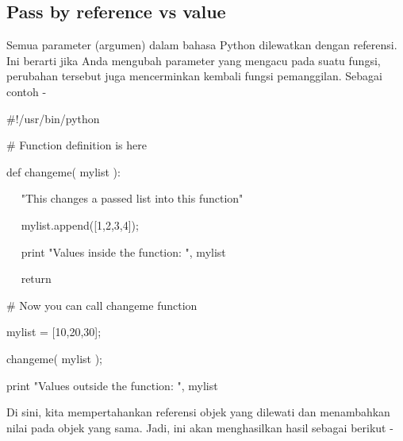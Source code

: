 \documentclass[a4paper,12pt]{report}
\begin{document}
\subsection*{Pass by reference vs value}
 \par
\begin{adjustwidth}{0.03in}{0.03in}
Semua parameter (argumen) dalam bahasa Python dilewatkan dengan referensi. Ini berarti jika Anda mengubah parameter yang mengacu pada suatu fungsi, perubahan tersebut juga mencerminkan kembali fungsi pemanggilan. Sebagai contoh -\end{adjustwidth}
 \par
\noindent 
 \hspace*{0.5in}  $  \#  $!/usr/bin/python \par
\vspace{12pt}
\noindent 
 \hspace*{0.5in}  $  \#  $ Function definition is here \par
\noindent 
 \hspace*{0.5in} def changeme( mylist ): \par
\noindent 
 \hspace*{0.5in} ~~ "This changes a passed list into this function" \par
\noindent 
~~  \hspace*{0.5in}  \hspace*{0.5in} mylist.append([1,2,3,4]); \par
\noindent 
~~  \hspace*{0.5in} print "Values inside the function: ", mylist \par
\noindent 
~~  \hspace*{0.5in} return \par
\noindent 
 \hspace*{0.5in} \vspace{12pt}
\noindent 
 \hspace*{0.5in}  $  \#  $ Now you can call changeme function \par
\noindent 
 \hspace*{0.5in} mylist = [10,20,30]; \par
\noindent 
 \hspace*{0.5in} changeme( mylist ); \par
\noindent 
 \hspace*{0.5in} print "Values outside the function: ", mylist \par
\begin{adjustwidth}{0.03in}{0.03in}
Di sini, kita mempertahankan referensi objek yang dilewati dan menambahkan nilai pada objek yang sama. Jadi, ini akan menghasilkan hasil sebagai berikut -\end{adjustwidth}
\end{document}

